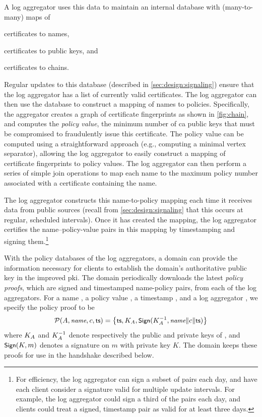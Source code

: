 A log aggregator uses this data to maintain an internal database with
(many-to-many) maps of
\begin{inparaenum}
\item certificates to names,
\item certificates to public keys, and
\item certificates to chains.
\end{inparaenum}
Regular updates to this database (described in \autoref{sec:design:signaling})
ensure that the log aggregator has a list of currently valid certificates. The
log aggregator can then use the database to construct a mapping of names to
policies. Specifically, the aggregator creates a graph of certificate
fingerprints as shown in \autoref{fig:chain}, and computes the \emph{policy
value}, the minimum number of \ac{ca} public keys that must be compromised to
fraudulently issue this certificate. The policy value can be computed using a
straightforward approach (e.g., computing a minimal vertex separator), allowing
the log aggregator to easily construct a mapping of certificate fingerprints to
policy values. The log aggregator can then perform a series of simple join
operations to map each name to the maximum policy number associated with a
certificate containing the name.

The log aggregator constructs this name-to-policy mapping each time it receives
data from public sources (recall from \autoref{sec:design:signaling} that this
occurs at regular, scheduled intervals). Once it has created the mapping, the log
aggregator certifies the name--policy-value pairs in this mapping by
timestamping and signing them.\footnote{For efficiency, the log aggregator can
  sign a subset of pairs each day, and have each client consider a signature
  valid for multiple update intervals. For example, the log aggregator could
  sign a third of the pairs each day, and clients could treat a signed,
timestamp pair as valid for at least three days.}

With the policy databases of the log aggregators, a domain can provide the
information necessary for clients to establish the domain's authoritative public
key in the improved \ac{pki}. The domain periodically downloads the latest
\emph{policy proofs}, which are signed and timestamped name-policy pairs, from
each of the log aggregators. For a name \hostname, a policy value \policy, a
timestamp \timestamp, and a log aggregator \logagg, we specify the policy proof
to be
\begin{equation}
  \mathcal{P}(A, \small{\emph{name}}, c, \textsf{ts}) = \left\{\textsf{ts},
  K_{A}, \small{\textsf{Sign}}(K_{A}^{-1}, \small{\emph{name}} \| c
\| \textsf{ts})\right\}
\end{equation}
where $K_{A}$ and $K_{A}^{-1}$ denote respectively the public
and private keys of \logagg, and $\small{\textsf{Sign}}(K, m)$ denotes a signature on $m$
with private key $K$. The domain keeps these proofs for use in the handshake
described below.

